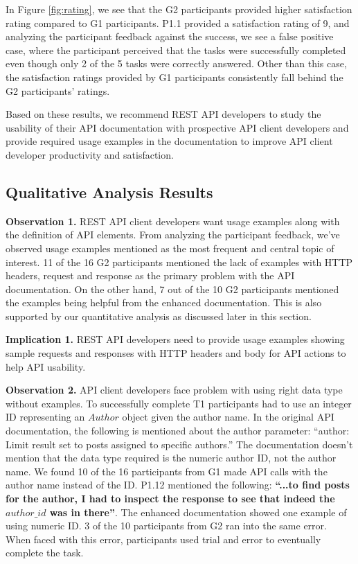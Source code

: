 \documentclass[conference]{IEEEtran}
\begin{document}
In Figure \ref{fig:rating}, we see that the G2 participants provided higher satisfaction rating compared to G1 participants. P1.1 provided a satisfaction rating of 9, and analyzing the participant feedback against the success, we see a false positive case, where the participant perceived that the tasks were successfully completed even though only 2 of the 5 tasks were correctly answered. Other than this case, the satisfaction ratings provided by G1 participants consistently fall behind the G2 participants' ratings.

Based on these results, we recommend REST API developers to study the usability of their API documentation with prospective API client developers and provide required usage examples in the documentation to improve API client developer productivity and satisfaction.



\subsection{Qualitative Analysis Results} %

\textbf{Observation 1.} REST API client developers want usage examples along with the definition of API elements. From analyzing the participant feedback, we've observed usage examples mentioned as the most frequent and central topic of interest. 11 of the 16 G2 participants mentioned the lack of examples with HTTP headers, request and response as the primary problem with the API documentation. On the other hand, 7 out of the 10 G2 participants mentioned the examples being helpful from the enhanced documentation. This is also supported by our quantitative analysis as discussed later in this section.

\textbf{Implication 1.} REST API developers need to provide usage examples showing sample requests and responses with HTTP headers and body for API actions to help API usability.


\textbf{Observation 2.} API client developers face problem with using right data type without examples. To successfully complete T1 participants had to use an integer ID representing an $Author$ object given the author name. In the original API documentation, the following is mentioned about the author parameter: ``author: Limit result set to posts assigned to specific authors.'' The documentation doesn't mention that the data type required is the numeric author ID, not the author name. We found 10 of the 16 participants from G1 made API calls with the author name instead of the ID. P1.12 mentioned the following: \textbf{``...to find posts for the author, I had to inspect the response to see that indeed the $author\_id$ was in there''}. The enhanced documentation showed one example of using numeric ID. 3 of the 10 participants from G2 ran into the same error. When faced with this error, participants used trial and error to eventually complete the task.
\end{document}
